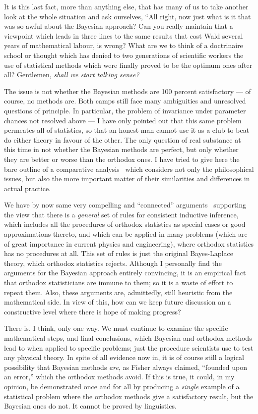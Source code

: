 \documentclass[12pt]{article}
\let\oldcite\cite
\renewcommand{\cite}{~\oldcite}
\begin{document}
It is this last fact, more than anything else, that has many of us to take another look at the whole situation and ask ourselves, ``All right, now just what is it that was so awful about the Bayesian approach? Can you really maintain that a viewpoint which leads in three lines to the same results that cost Wald several years of mathematical labour, is wrong? What are we to think of a doctrinaire school or thought which has denied to two generations of scientific workers the use of statistical methods which were finally proved to be the optimum ones after all? Gentlemen, \emph{shall we start talking sense?}

The issue is not whether the Bayesian methods are 100 percent satisfactory --- of course, no methods are. Both camps still face many ambiguities and unresolved questions of principle. In particular,  the problem of invariance under parameter chances
not resolved above --- I have only pointed out that this same problem permeates all of statistics, so that an honest man cannot use it as a club to beat do either theory in favour of the other. The only question of real substance at this time in not whether the Bayesian methods are perfect, but only whether they are better or worse than the orthodox ones. I have tried to give here the bare outline of a comparative analysis\cite{jaynes} which considers not only the philosophical issues, but also the more important matter of their similarities and differences in actual practice.

We have by now same very compelling and ``connected'' arguments\cite{jaynes,cox,coxjaynes} supporting the view that there is a \emph{general} set of rules for consistent inductive inference, which includes all the procedures of orthodox statistics as special cases or good approximations thereto, and which can be applied in many problems (which are of great importance in current physics and engineering), where orthodox statistics has no procedures at all. This set of rules is just the original Bayes-Laplace theory, which orthodox statistics rejects. Although I personally find the arguments for the Bayesian approach entirely convincing, it is an empirical fact that orthodox statisticians are immune to them; so it is a waste of effort to repeat them. Also, these arguments are, admittedly, still heuristic from the mathematical side. In view of this, how can we keep future discussion an a constructive level where there is hope of making progress?

There is, I think, only one way. We must continue to examine the specific mathematical steps, and final conclusions, which Bayesian and orthodox methods lead to when applied to specific problems; just the procedure scientists use to test any physical theory. In spite of all evidence now in, it is of course still a logical possibility that Bayesian methods \emph{are}, as Fisher always claimed, ``founded upon an error,'' which the orthodox methods avoid. If this is true, it could, in my opinion, be demonstrated once and for all by producing a \emph{single} example of a statistical problem where the orthodox methods give a satisfactory result, but the Bayesian ones do not. It cannot be proved by linguistics.
\end{document}
